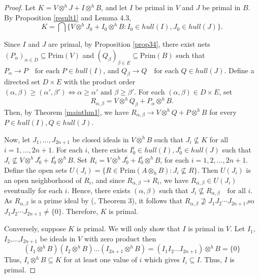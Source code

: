\documentclass{birkjour}
\theoremstyle{definition}
\theoremstyle{remark}
\numberwithin{equation}{section}
\begin{document}
\begin{proof}

Let \( K = V \otimes^h J + I \otimes^h B \), and  let $I$ be primal in $V$ and $J$ be primal in $B$.  By Proposition \ref{result1} and Lemma 4.3,
\[
K= \bigcap \{ V\otimes^{h} J_0 + I_0 \otimes^{h} B : I_0 \in hull(I), J_0\in hull(J)\} .
\]

Since \( I \) and \( J \) are primal, by Proposition \ref{prop34}, there exist nets \( (P_\alpha)_{\alpha \in D} \subseteq \mathrm{Prim}(V) \) and \( (Q_\beta)_{\beta \in E} \subseteq \mathrm{Prim}(B) \) such that $P_\alpha \to P \quad \text{for each } P \in hull(I)$, and  $Q_\beta \to Q \quad \text{for each } Q \in hull(J)$. Define a directed set \( D \times E \) with the product order $(\alpha, \beta) \geq (\alpha', \beta') \iff \alpha \geq \alpha' \text{ and } \beta \geq \beta'$.
For each \( (\alpha, \beta) \in D \times E \), set
\[
R_{\alpha,\beta} = V \otimes^h Q_\beta + P_\alpha \otimes^h B.
\]
Then, by Theorem \ref{mainthm1}, we have \( R_{\alpha,\beta} \to V \otimes^h Q + P \otimes^h B \) for every \(P \in hull(I),   Q \in hull(J)\).

Now, let \( J_1, \ldots, J_{2n +1}\) be closed ideals in \( V \otimes^h B \) such that \( J_i \nsubseteq K \) for all \( i = 1, \ldots, 2n+1 \). For each \( i \), there exists \( I_0^i   \in hull(I), J_0^i\in hull(J)\) such that \( J_i \nsubseteq V \otimes^h J_0^i + I_0^i \otimes^h B \). Set $R_i= V \otimes^h J_0^i + I_0^i \otimes^h B$, for each $i=1,2,..., 2n+1$. Define the open sets $U(J_i) = \{ R \in \mathrm{Prim}(A \otimes_h B) : J_i \nsubseteq R \}$. Then \( U(J_i) \) is an open neighborhood of \( R_i \), and since \( R_{\alpha,\beta} \to R_i \), we have \( R_{\alpha,\beta} \in U(J_i) \) eventually for each \( i \). Hence, there exists \( (\alpha, \beta) \) such that $J_i \nsubseteq R_{\alpha,\beta} \quad \text{for all } i$. As \( R_{\alpha,\beta} \) is a prime ideal by (\cite{AA}, Theorem 3), it follows that $R_{\alpha,\beta} \nsupseteq J_1 J_2 \cdots J_{2n+1}$,so
$J_1 J_2 \cdots J_{2n+1} \neq \{0\}$. Therefore, \( K \) is primal.

Conversely, suppose \( K\) is primal. We will only show that $I$ is primal in $V$. Let $I_1$, $I_2$,...,$I_{2n+1}$ be ideals in $V$ with zero product then $$(I_1 \otimes^h B) (I_2 \otimes^h B)... (I_{2n+1} \otimes^h B)= (I_1I_2...I_{2n+1}) \otimes^h B= \{0\}$$ Thus, $I_i \otimes^h B \subseteq K$ for at least one value of $i$ which gives $I_i \subseteq I$. Thus, $I$ is primal.


    
\end{proof}
\end{document}
